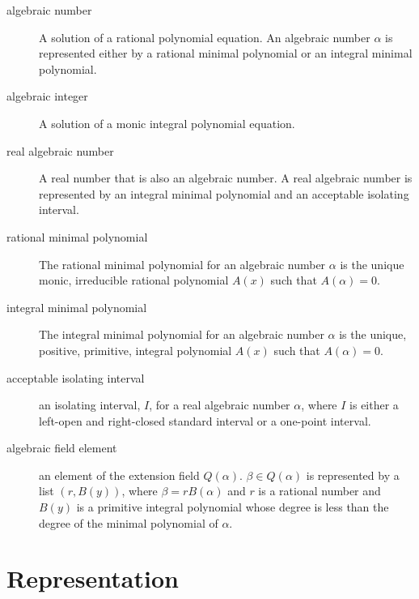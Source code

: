 \begin{description}
\item[algebraic number]
  A solution of a rational polynomial equation.
An algebraic number $\alpha$ is represented either by a rational
minimal polynomial or an integral minimal polynomial.

\item[algebraic integer]
  A solution of a monic integral polynomial equation.

\item[real algebraic number]
  A real number that is also an algebraic
number.  A real algebraic number is represented by an
integral minimal polynomial and an acceptable isolating interval.

\item[rational minimal polynomial]
  The rational minimal polynomial for
an algebraic number $\alpha$ is the unique monic, irreducible rational
polynomial $A(x)$ such that $A(\alpha) = 0$.

\item[integral minimal polynomial]
  The integral minimal polynomial for
an algebraic number $\alpha$ is the unique, positive, primitive, integral
polynomial $A(x)$ such that $A(\alpha) = 0$.

\item[acceptable isolating interval]
 an isolating interval, $I$, for
a real algebraic number $\alpha$,
where $I$ is either a left-open and right-closed
standard interval or a one-point interval.  

\item[algebraic field element]
  an element of the extension field $Q(\alpha)$.
$\beta \in Q(\alpha)$ is represented by a list $(r,B(y))$, where
$\beta = rB(\alpha)$ and $r$ is a rational number and $B(y)$ is a primitive
integral polynomial whose degree is less than the degree of the minimal
polynomial of $\alpha$.
\end{description}


\section{Representation}

